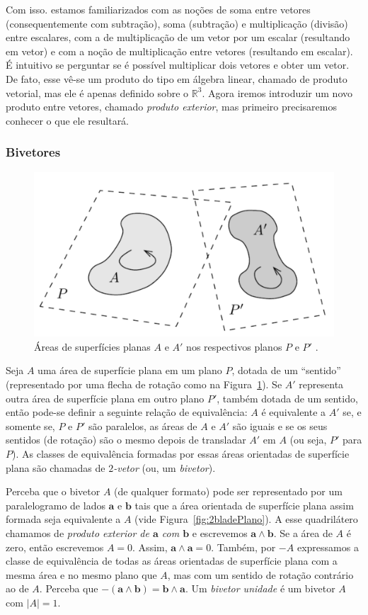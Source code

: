 \documentclass[a4paper,12pt]{report}
\theoremstyle{plain}
\theoremstyle{definition}
\newcommand{\norm}[1]{\left| #1 \right|}
\begin{document}
Com isso. estamos familiarizados com as noções de soma entre vetores (consequentemente com subtração), soma (subtração) e multiplicação (divisão) entre escalares, com a de multiplicação de um vetor por um escalar (resultando em vetor) e com a noção de multiplicação entre vetores (resultando em escalar). É intuitivo se perguntar se é possível multiplicar dois vetores e obter um vetor. De fato, esse vê-se um produto do tipo em álgebra linear, chamado de produto vetorial, mas ele é apenas definido sobre o $\mathbb{R}^3$. Agora iremos introduzir um novo produto entre vetores, chamado \textit{produto exterior}, mas primeiro precisaremos conhecer o que ele resultará.

\subsubsection{Bivetores}

\begin{figure}[H]
	\begin{center}
		\includegraphics[width=0.5\linewidth]{figures/2blade.pdf}
	\end{center}
	\caption{Áreas de superfícies planas $A$ e $A'$ nos respectivos planos $P$ e $P'$ \cite{lundholm2009clifford}.}
	\label{fig:2blade}
\end{figure}

Seja $A$ uma área de superfície plana em um plano $P$, dotada de um ``sentido'' (representado por uma flecha de rotação como na Figura~\ref{fig:2blade}). Se $A'$ representa outra área de superfície plana em outro plano $P'$, também dotada de um sentido, então pode-se definir a seguinte relação de equivalência: $A$ é equivalente a $A'$ se, e somente se, $P$ e $P'$ são paralelos, as áreas de $A$ e $A'$ são iguais e se os seus sentidos (de rotação) são o mesmo depois de transladar $A'$ em $A$ (ou seja, $P'$ para $P$). As classes de equivalência formadas por essas áreas orientadas de superfície plana são chamadas de \textit{$2$-vetor} (ou, um \textit{bivetor}).

Perceba que o bivetor $A$ (de qualquer formato) pode ser representado por um paralelogramo de lados $\mathbf a$ e $\mathbf b$ tais que a área orientada de superfície plana assim formada seja equivalente a $A$ (vide Figura~\ref{fig:2bladePlano}). A esse quadrilátero chamamos de \textit{produto exterior de $\mathbf a$ com $\mathbf b$} e escrevemos $\mathbf a \wedge \mathbf b$. Se a área de $A$ é zero, então escrevemos $A = 0$. Assim, $\mathbf a \wedge \mathbf a = 0$. Também, por $-A$ expressamos a classe de equivalência de todas as áreas orientadas de superfície plana com a mesma área e no mesmo plano que $A$, mas com um sentido de rotação contrário ao de $A$. Perceba que $-(\mathbf a \wedge \mathbf b) = \mathbf b \wedge \mathbf a$. Um \textit{bivetor unidade} é um bivetor $A$ com $\norm{A} = 1$.
\end{document}
